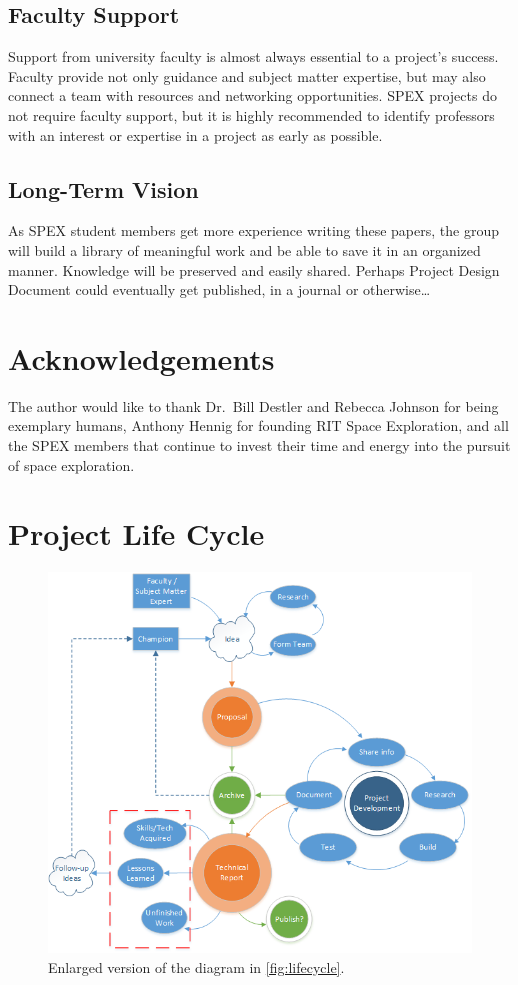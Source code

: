 \documentclass[conference]{IEEEtran} %
\begin{document}
\subsection{Faculty Support}
Support from university faculty is almost always essential to a project's success.
Faculty provide not only guidance and subject matter expertise, but may also connect a team with resources and networking opportunities.
SPEX projects do not require faculty support, but it is highly recommended to identify professors with an interest or expertise in a project as early as possible.

\subsection{Long-Term Vision}
\label{sec:vision}
As SPEX student members get more experience writing these papers, the group will build a library of meaningful work and be able to save it in an organized manner.
Knowledge will be preserved and easily shared.
Perhaps Project Design Document could eventually get published, in a journal or otherwise\ldots

\section*{Acknowledgements}
The author would like to thank Dr.~Bill Destler and Rebecca Johnson for being exemplary humans, Anthony Hennig for founding RIT Space Exploration, and all the SPEX members that continue to invest their time and energy into the pursuit of space exploration.

\onecolumn
\appendices{}
\section{Project Life Cycle}
\begin{figure}[h]
  \centering
  \includegraphics[]{figs/project-life-cycle.png}
  \caption{Enlarged version of the diagram in \autoref{fig:lifecycle}.}
\end{figure}
\end{document}
